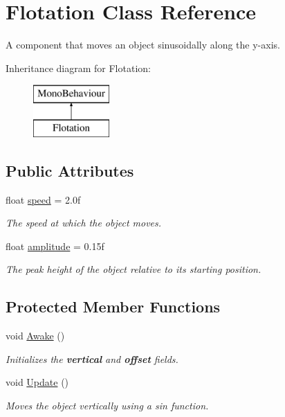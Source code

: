 \hypertarget{class_flotation}{}\section{Flotation Class Reference}
\label{class_flotation}


A component that moves an object sinusoidally along the y-\/axis.  


Inheritance diagram for Flotation\+:\begin{figure}[H]
\begin{center}
\leavevmode
\includegraphics[height=2.000000cm]{class_flotation}
\end{center}
\end{figure}
\subsection*{Public Attributes}
\begin{DoxyCompactItemize}
\item 
float \mbox{\hyperlink{class_flotation_abd82625dad57d098d76b1c3dd58446ab}{speed}} = 2.\+0f
\begin{DoxyCompactList}\small\item\em The speed at which the object moves. \end{DoxyCompactList}\item 
float \mbox{\hyperlink{class_flotation_af38935704bdd56408d8ee8dbd9fffe5d}{amplitude}} = 0.\+15f
\begin{DoxyCompactList}\small\item\em The peak height of the object relative to its starting position. \end{DoxyCompactList}\end{DoxyCompactItemize}
\subsection*{Protected Member Functions}
\begin{DoxyCompactItemize}
\item 
void \mbox{\hyperlink{class_flotation_a19af8367d8cdd79605ff0576fe1ea532}{Awake}} ()
\begin{DoxyCompactList}\small\item\em Initializes the {\bfseries vertical} and {\bfseries offset} fields. \end{DoxyCompactList}\item 
void \mbox{\hyperlink{class_flotation_a625c95b86b0892446db94645731a2a81}{Update}} ()
\begin{DoxyCompactList}\small\item\em Moves the object vertically using a sin function. \end{DoxyCompactList}\end{DoxyCompactItemize}


